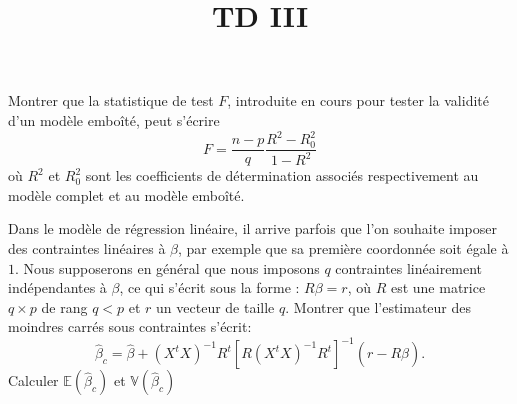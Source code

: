 \documentclass{td_um}
\title{TD III}
\providecommand{\1}{\mathds{1}}
\begin{document}
\maketitle


\exo{}  Montrer que la statistique de test $F$, introduite en cours pour tester la validité d'un modèle emboîté, peut s'écrire
\[
F=\frac{n-p}{q} \frac{R^{2}-R_{0}^{2}}{1-R^{2}}
\]
où $R^{2}$ et $R_{0}^{2}$ sont les coefficients de détermination associés respectivement au modèle complet et au modèle emboîté.


\exo{} Dans le modèle de régression linéaire, il arrive parfois que l'on souhaite imposer des contraintes linéaires à $\beta$, par exemple que sa première coordonnée soit égale à $1$. Nous supposerons en général que nous imposons $q$ contraintes linéairement indépendantes à $\beta$, ce qui s'écrit sous la forme : $R \beta=r$, où $R$ est une matrice $q \times p$ de rang $q<p$ et $r$ un vecteur de taille $q$. Montrer que l'estimateur des moindres carrés sous contraintes s'écrit:
\[
\hat{\beta}_{c}=\hat{\beta}+\left(X^{t} X\right)^{-1} R^{t}\left[R\left(X^{t} X\right)^{-1} R^{t}\right]^{-1}(r-R \hat{\beta}).
\]
Calculer  $\mathbb{E}\left(\hat{\beta}_{c}\right)$ et  $\mathbb{V}\left(\hat{\beta}_{c}\right)$

\end{document}
